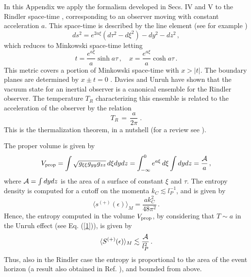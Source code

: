 \appendixb

\noindent In this Appendix we apply the formalism developed in
Secs. IV and V to the Rindler space-time \cite{rindler},
corresponding to an observer moving with constant acceleration
$a$. This space-time is described by the line element (see for
example \cite{birrell})
\begin{equation}\label{rindler}
  ds^2=e^{2a\xi}(d\tau^2-d\xi^2)-dy^2-dz^2\,,
\end{equation}
which reduces to Minkowski space-time letting
 \begin{equation}
 t=\frac{e^{a\xi}}{a}\sinh a\tau\,, \quad x=\frac{e^{a\xi}}{a}\cosh
 a\tau\,.
 \end{equation}
This metric covers a portion of Minkowski space-time with $x>\vert
t\vert$. The boundary planes are determined by $x\pm t=0$
\cite{rindler}. Davies \cite{Davies:1974th} and Unruh
\cite{Unruh:db} have shown that the vacuum state for an inertial
observer is a canonical ensemble for the Rindler observer. The
temperature $T_R$ characterizing  this ensemble is related to the
acceleration of the observer by the relation
\begin{equation}\label{1}
T_R\,=\,\frac{a}{2\pi} \;.
\end{equation}
This is the thermalization theorem, in a nutshell (for a review
see \cite{TAK}).

\noindent The proper volume is given by
 \begin{equation}
 V_{\rm prop}= \int \sqrt{g_{\xi\xi} g_{yy} g_{zz}} \, d\xi dy dz =
 \int_{-\infty}^0 e^{a\xi}\,d\xi \int dy dz = \frac{\cal A}{a} \,,
 \end{equation}
where ${\cal A} = \int dy dz$ is the area of a surface of constant
$\xi$ and $\tau$. The entropy density is computed for a cutoff on
the momenta $k_C \lesssim l_P^{-1}$, and is given by
 \begin{equation}
\langle s^{(+)} (\epsilon) \rangle_M = \frac{a k_C^2}{48 \pi^2}
\,.
 \end{equation}
Hence, the entropy computed in the volume $V_{\rm prop}$, by
considering that $T\sim a$ in the Unruh effect (see Eq.
(\ref{1})), is given by
 \begin{equation}
\langle S^{(+)}(\epsilon)\rangle_M \lesssim \frac{\cal A}{l_P^2}
\,.
 \end{equation}
Thus, also in the Rindler case the entropy is proportional to the
area of the event horizon (a result also obtained in Ref.
\cite{Laflamme:ec,Terashima:1999vw}), and bounded from above.

